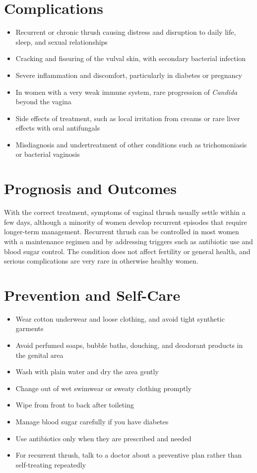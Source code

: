 \section*{Complications}
\begin{itemize}
    \item Recurrent or chronic thrush causing distress and disruption to daily life, sleep, and sexual relationships
    \item Cracking and fissuring of the vulval skin, with secondary bacterial infection
    \item Severe inflammation and discomfort, particularly in diabetes or pregnancy
    \item In women with a very weak immune system, rare progression of \textit{Candida} beyond the vagina
    \item Side effects of treatment, such as local irritation from creams or rare liver effects with oral antifungals
    \item Misdiagnosis and undertreatment of other conditions such as trichomoniasis or bacterial vaginosis
\end{itemize}

\section*{Prognosis and Outcomes}
With the correct treatment, symptoms of vaginal thrush usually settle within a few days, although a minority of women develop recurrent episodes that require longer-term management. Recurrent thrush can be controlled in most women with a maintenance regimen and by addressing triggers such as antibiotic use and blood sugar control. The condition does not affect fertility or general health, and serious complications are very rare in otherwise healthy women.

\section*{Prevention and Self-Care}
\begin{itemize}
    \item Wear cotton underwear and loose clothing, and avoid tight synthetic garments
    \item Avoid perfumed soaps, bubble baths, douching, and deodorant products in the genital area
    \item Wash with plain water and dry the area gently
    \item Change out of wet swimwear or sweaty clothing promptly
    \item Wipe from front to back after toileting
    \item Manage blood sugar carefully if you have diabetes
    \item Use antibiotics only when they are prescribed and needed
    \item For recurrent thrush, talk to a doctor about a preventive plan rather than self-treating repeatedly
\end{itemize}

